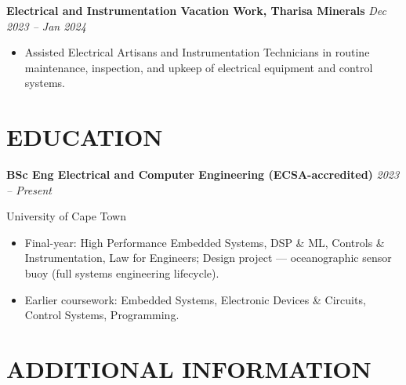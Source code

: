 \documentclass[10pt,a4paper]{article}
\newcommand{\workentry}[2]{%
  \noindent\textbf{\small #1} \hfill
  \textit{\small #2}\par
  \vspace{2pt}
}
\begin{document}
\vspace{3pt}

\workentry{Electrical and Instrumentation Vacation Work, Tharisa Minerals}{Dec 2023 -- Jan 2024}
\begin{itemize}
  \item Assisted Electrical Artisans and Instrumentation Technicians in routine maintenance, inspection, and upkeep of electrical equipment and control systems.
\end{itemize}

\section{EDUCATION}

\workentry{BSc Eng Electrical and Computer Engineering (ECSA-accredited)}{2023 -- Present}
{\small University of Cape Town}\par
\vspace{1pt}

\begin{itemize}
  \item Final-year: High Performance Embedded Systems, DSP \& ML, Controls \& Instrumentation, Law for Engineers; Design project --- oceanographic sensor buoy (full systems engineering lifecycle).
  \item Earlier coursework: Embedded Systems, Electronic Devices \& Circuits, Control Systems, Programming.
\end{itemize}

\section{ADDITIONAL INFORMATION}
\end{document}
